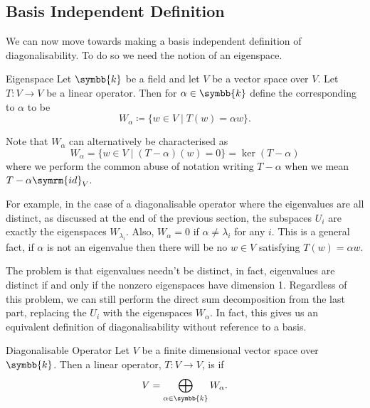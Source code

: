 \documentclass[fleqn]{NotesClass}
\renewcommand{\field}{\symbb{k}}
\newcommand{\id}{\symrm{id}}
\begin{document}
    \subsection{Basis Independent Definition}
    We can now move towards making a basis independent definition of diagonalisability.
    To do so we need the notion of an eigenspace.
    
    \begin{dfn}{Eigenspace}{}
        Let \(\field\) be a field and let \(V\) be a vector space over \(V\).
        Let \(T \colon V \to V\) be a linear operator.
        Then for \(\alpha \in \field\) define the  corresponding to \(\alpha\) to be
        \begin{equation}
            W_\alpha \coloneq \{w \in V \mid T(w) = \alpha w\}.
        \end{equation}
    \end{dfn}
    
    Note that \(W_\alpha\) can alternatively be characterised as
    \begin{equation}
        W_\alpha = \{w \in V \mid (T - \alpha)(w) = 0\} = \ker(T - \alpha)
    \end{equation}
    where we perform the common abuse of notation writing \(T - \alpha\) when we mean \(T - \alpha \id_V\).
    
    For example, in the case of a diagonalisable operator where the eigenvalues are all distinct, as discussed at the end of the previous section, the subspaces \(U_i\) are exactly the eigenspaces \(W_{\lambda_i}\).
    Also, \(W_{\alpha} = 0\) if \(\alpha \ne \lambda_i\) for any \(i\).
    This is a general fact, if \(\alpha\) is not an eigenvalue then there will be no \(w \in V\) satisfying \(T(w) = \alpha w\).
    
    The problem is that eigenvalues needn't be distinct, in fact, eigenvalues are distinct if and only if the nonzero eigenspaces have dimension 1.
    Regardless of this problem, we can still perform the direct sum decomposition from the last part, replacing the \(U_i\) with the eigenspaces \(W_\alpha\).
    In fact, this gives us an equivalent definition of diagonalisability without reference to a basis.
    
    \begin{dfn}{Diagonalisable Operator}{}
        Let \(V\) be a finite dimensional vector space over \(\field\).
        Then a linear operator, \(T \colon V \to V\), is  if 
        \begin{equation}
            V = \bigoplus_{\alpha \in \field} W_\alpha.
        \end{equation}
    \end{dfn}
    
\end{document}
